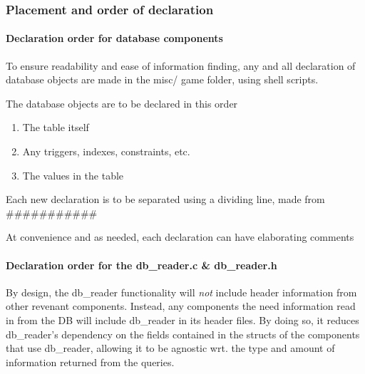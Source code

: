 \documentclass{report}
\begin{document}
\subsubsection*{Placement and order of declaration}
\paragraph*{Declaration order for database components}
To ensure readability and ease of information finding, any and all declaration of database objects are made in the misc/ game folder, using shell scripts.

The database objects are to be declared in this order
\begin{enumerate}
\item The table itself
\item Any triggers, indexes, constraints, etc.
\item The values in the table
\end{enumerate}

Each new declaration is to be separated using a dividing line, made from \#\#\#\#\#\#\#\#\#\#\#

At convenience and as needed, each declaration can have elaborating comments
\paragraph*{Declaration order for the db\_reader.c \& db\_reader.h}
By design, the db\_reader functionality will \textit{not} include header information from other revenant components. Instead, any components the need information read in from the DB will include db\_reader in its header files. By doing so, it reduces db\_reader's dependency on the fields contained in the structs of the components that use db\_reader, allowing it to be agnostic wrt. the type and amount of information returned from the queries. 
\end{document}
